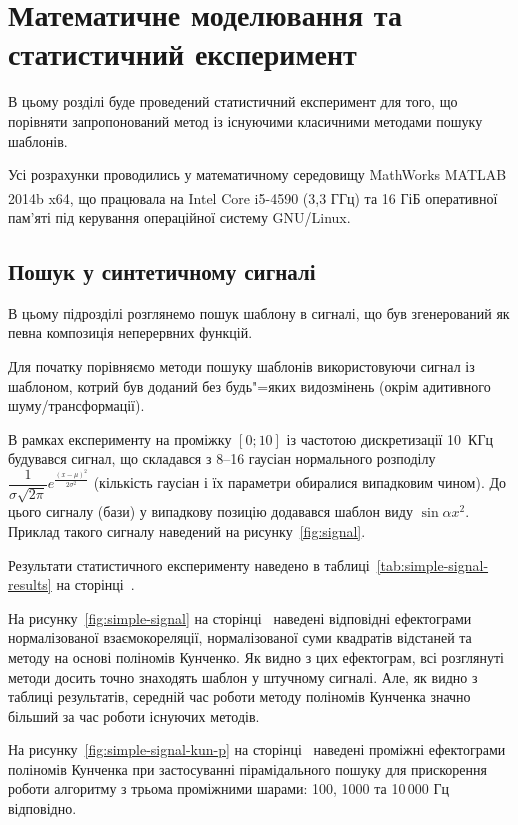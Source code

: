 \chapter{Математичне моделювання та статистичний експеримент}
\label{chap:testing}

В цьому розділі буде проведений статистичний експеримент для того, що порівняти запропонований метод із існуючими
класичними методами пошуку шаблонів.

Усі розрахунки проводились у математичному середовищу MathWorks MATLAB 2014b x64, що працювала на
Intel\textsuperscript{\texttrademark} Core i5-4590 (3,3 ГГц) та 16 ГіБ оперативної пам’яті під керування операційної
систему GNU/Linux.

\section{Пошук у синтетичному сигналі}
    В цьому підрозділі розглянемо пошук шаблону в сигналі, що був згенерований як певна композиція неперервних
    функцій.

    Для початку порівняємо методи пошуку шаблонів використовуючи сигнал із шаблоном, котрий був доданий без
    будь"=яких видозмінень (окрім адитивного шуму/трансформації).

    В рамках експерименту на проміжку ${[0; 10]}$ із частотою дискретизації 10~КГц будувався сигнал, що складався
    з 8--16 гаусіан нормального розподілу $\dfrac{1}{\sigma\sqrt{2\pi}}
    e^{\frac{{\left(x-\mu\right)}^2}{2\sigma^2}}$
    (кількість гаусіан і їх параметри обиралися випадковим чином).
    До цього сигналу (бази) у випадкову позицію додавався шаблон виду $\sin{\alpha x^2}$.
    Приклад такого сигналу наведений на рисунку~\ref{fig:signal}.

    Результати статистичного експерименту наведено в таблиці~\ref{tab:simple-signal-results} на
    сторінці~\pageref{tab:simple-signal-results}.

    На рисунку~\ref{fig:simple-signal} на сторінці~\pageref{fig:simple-signal} наведені відповідні ефектограми
    нормалізованої взаємокореляції, нормалізованої суми квадратів відстаней та методу на основі поліномів Кунченко.
    Як видно з цих ефектограм, всі розглянуті методи досить точно знаходять шаблон у штучному сигналі.
    Але, як видно з таблиці результатів, середній час роботи методу поліномів Кунченка значно більший за час роботи
    існуючих методів.

    На рисунку~\ref{fig:simple-signal-kun-p} на сторінці~\pageref{fig:simple-signal-kun-p} наведені проміжні
    ефектограми поліномів Кунченка при застосуванні пірамідального пошуку для прискорення роботи алгоритму з трьома
    проміжними шарами: 100, 1000 та 10\,000 Гц відповідно.


